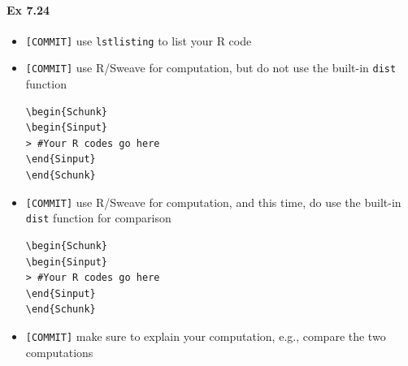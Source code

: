\documentclass[12pt]{article}
\begin{document}
\paragraph{Ex 7.24}
\begin{itemize}
    \item \verb+[COMMIT]+ use \verb+lstlisting+ to list your R code
    \item \verb+[COMMIT]+ use R/Sweave for computation, but do not use the built-in \verb+dist+
        function
\begin{lstlisting}
\begin{Schunk}
\begin{Sinput}
> #Your R codes go here
\end{Sinput}
\end{Schunk}
\end{lstlisting}
    \item \verb+[COMMIT]+ use R/Sweave for computation, and this time, do use the built-in \verb+dist+
        function for comparison
\begin{lstlisting}
\begin{Schunk}
\begin{Sinput}
> #Your R codes go here
\end{Sinput}
\end{Schunk}
\end{lstlisting}
    \item \verb+[COMMIT]+ make sure to explain your computation, e.g., compare the two
        computations
\end{itemize}
\end{document}
